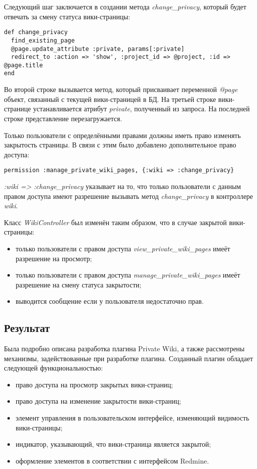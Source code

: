 Следующий шаг заключается в создании метода \textit{change\_privacy}, который
будет отвечать за смену статуса вики-страницы:
\small{\begin{lstlisting}
def change_privacy
  find_existing_page 
  @page.update_attribute :private, params[:private]
  redirect_to :action => 'show', :project_id => @project, :id => @page.title
end
\end{lstlisting}}
Во второй строке вызывается метод, который присваивает переменной
\textit{@page} объект, связанный с текущей вики-страницей в БД. На третьей
строке вики-странице устанавливается атрибут \textit{private}, полученный из
запроса. На последней строке представление перезагружается.

Только пользователи с определёнными правами должны иметь право изменять
закрытость страницы. В связи с этим было добавлено дополнительное право
доступа:
\small{\begin{lstlisting}
permission :manage_private_wiki_pages, {:wiki => :change_privacy}
\end{lstlisting}}
\textit{:wiki => :change\_privacy} указывает на то, что только пользователи с
данным правом доступа имеют разрешение вызывать метод \textit{change\_privacy}
в контроллере \textit{wiki}.

Класс \textit{WikiController} был изменён таким образом, что в случае закрытой
вики-страницы:
\begin{itemize}
  \item только пользователи с правом доступа
  \textit{view\_private\_wiki\_pages} имеёт разрешение на просмотр;
  \item только пользователи с правом доступа
  \textit{manage\_private\_wiki\_pages} имеёт разрешение на смену статуса
  закрытости;
  \item выводится сообщение если у пользователя недостаточно прав.
\end{itemize}

\subsection{Результат}
Была подробно описана разработка плагина Private Wiki, а также рассмотрены
механизмы, задействованные при разработке плагина. Созданный плагин обладает
следующей функциональностью:
\begin{itemize}
  \item право доступа на просмотр закрытых вики-страниц;
  \item право доступа на изменение закрытости вики-страниц; 
  \item элемент управления в пользовательском интерфейсе, изменяющий
  видимость вики-страницы;
  \item индикатор, указывающий, что вики-страница является закрытой;
  \item оформление элементов в соответствии с интерфейсом Redmine.
\end{itemize}


